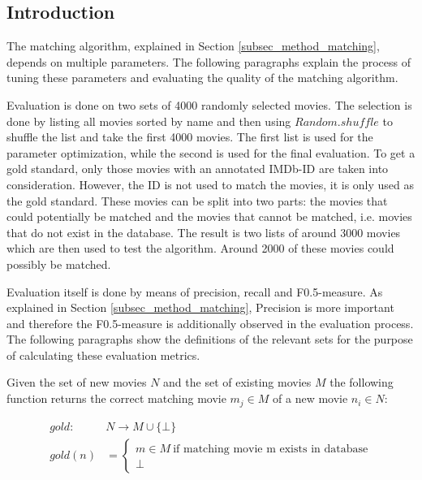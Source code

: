 \label{subsec_evaluation_matching}

\subsection{Introduction}
The matching algorithm, explained in Section \ref{subsec_method_matching}, depends on multiple parameters.
The following paragraphs explain the process of tuning these parameters and evaluating the quality of the matching algorithm.

Evaluation is done on two sets of 4000 randomly selected movies.
The selection is done by listing all movies sorted by name and then using $Random.shuffle$ to shuffle the list and take the first 4000 movies.
The first list is used for the parameter optimization, while the second is used for the final evaluation.
To get a gold standard, only those movies with an annotated IMDb-ID are taken into consideration.
However, the ID is not used to match the movies, it is only used as the gold standard.
These movies can be split into two parts: the movies that could potentially be matched and the movies that cannot be matched, i.e. movies that do not exist in the database.
The result is two lists of around 3000 movies which are then used to test the algorithm.
Around 2000 of these movies could possibly be matched.

Evaluation itself is done by means of precision, recall and F0.5-measure.
As explained in Section \ref{subsec_method_matching}, Precision is more important and therefore the F0.5-measure is additionally observed in the evaluation process.
The following paragraphs show the definitions of the relevant sets for the purpose of calculating these evaluation metrics.

Given the set of new movies $N$ and the set of existing movies $M$ the following function returns the correct matching movie $m_{j} \in M$ of a new movie $n_{i} \in N$:

\begin{align}
	gold: ~&N \rightarrow M \cup \{\bot\} \\
	gold(n) &=
		\begin{cases}
		m \in M ~\text{if matching movie m exists in database}  \\
		\bot
		\end{cases}
\end{align}

